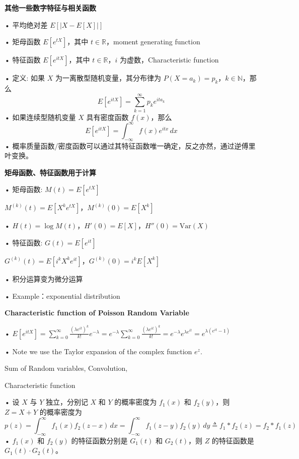 \documentclass[UTF8]{report}
\theoremstyle{MyLineTheoremStyle} %
\theoremstyle{MyBlockTheoremStyle} %
\theoremstyle{MySubsubsectionStyle} %
\begin{document}
\vspace{1cm}

\textbf{其他一些数字特征与相关函数}\par
• 平均绝对差 $E[|X - E[X]|]$\par
• 矩母函数 $E[e^{tX}]$，其中 $t \in \mathbb{R}$，moment generating function\par
• 特征函数 $E[e^{itX}]$，其中 $t \in \mathbb{R}$，$i$ 为虚数，Characteristic function\par
• 定义: 如果 $X$ 为一离散型随机变量，其分布律为 $P(X = a_k) = p_k$，$k \in \mathbb{N}$，那么
\[
E[e^{itX}] = \sum_{k=1}^{\infty} p_k e^{it a_k}
\]
• 如果连续型随机变量 $X$ 具有密度函数 $f(x)$，那么
\[
E[e^{itX}] = \int_{-\infty}^{\infty} f(x) e^{itx} \, dx
\]
• 概率质量函数/密度函数可以通过其特征函数唯一确定，反之亦然，通过逆傅里叶变换。

\vspace{1cm}

\textbf{矩母函数、特征函数用于计算}\par
• 矩母函数: $M(t) = E[e^{tX}]$\par
$M^{(k)}(t) = E[X^k e^{tX}]$，$M^{(k)}(0) = E[X^k]$\par
• $H(t) = \log M(t)$，$H'(0) = E[X]$，$H''(0) = \text{Var}(X)$\par
• 特征函数: $G(t) = E[e^{it}]$\par
$G^{(k)}(t) = E[i^k X^k e^{it}]$，$G^{(k)}(0) = i^k E[X^k]$\par
• 积分运算变为微分运算\par
• Example：exponential distribution\par

\vspace{1cm}

\textbf{Characteristic function of Poisson Random Variable}\par
• $E[e^{itX}] = \sum_{k=0}^{\infty} \frac{(\lambda e^{it})^k}{k!} e^{-\lambda} = e^{-\lambda} \sum_{k=0}^{\infty} \frac{(\lambda e^{it})^k}{k!} = e^{-\lambda} e^{\lambda e^{it}} = e^{\lambda (e^{it} - 1)}$\par
• Note we use the Taylor expansion of the complex function $e^z$.\par

\vspace{1cm}

Sum of Random variables, Convolution, \par
Characteristic function\par
• 设 $X$ 与 $Y$ 独立，分别记 $X$ 和 $Y$ 的概率密度为 $f_1(x)$ 和 $f_2(y)$，则 $Z = X + Y$ 的概率密度为
\[
p(z) = \int_{-\infty}^{\infty} f_1(x) f_2(z - x) \, dx = \int_{-\infty}^{\infty} f_1(z - y) f_2(y) \, dy \triangleq f_1 * f_2(z) = f_2 * f_1(z)
\]
• $f_1(x)$ 和 $f_2(y)$ 的特征函数分别是 $G_1(t)$ 和 $G_2(t)$，则 $Z$ 的特征函数是 $G_1(t) \cdot G_2(t)$。\par
\end{document}
